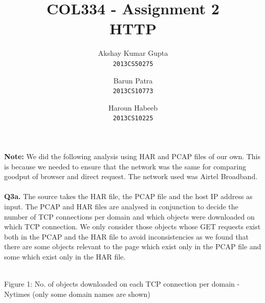 \documentclass[12pt]{article}
\begin{document}
\title{COL334 - Assignment 2\\ HTTP}
\author{Akshay Kumar Gupta\\\texttt{2013CS50275} \and  Barun Patra\\\texttt{2013CS10773} \and Haroun Habeeb\\\texttt{2013CS10225}}
\date{}
\maketitle
\noindent
\textbf{Note:} We did the following analysis using HAR and PCAP files of our own. This is because we needed to ensure that the network was the same for comparing goodput of browser and direct request. The network used was Airtel Broadband.\\\\
{\bfseries Q3a.} The source takes the HAR file, the PCAP file and the host IP address as input. The PCAP and HAR files are analysed in conjunction to decide the number of TCP connections per domain and which objects were downloaded on which TCP connection. We only consider those objects whose GET requests exist both in the PCAP and the HAR file to avoid inconsistencies as we found that there are some objects relevant to the page which exist only in the PCAP file and some which exist only in the HAR file.
\\\\
\hspace*{-1.4cm}
{
}
\vspace*{-0.6cm}
\begin{center}Figure 1: No. of objects downloaded on each TCP connection per domain - Nytimes (only some domain names are shown)\end{center}
\hspace*{-1.4cm}
{
}
\end{document}

